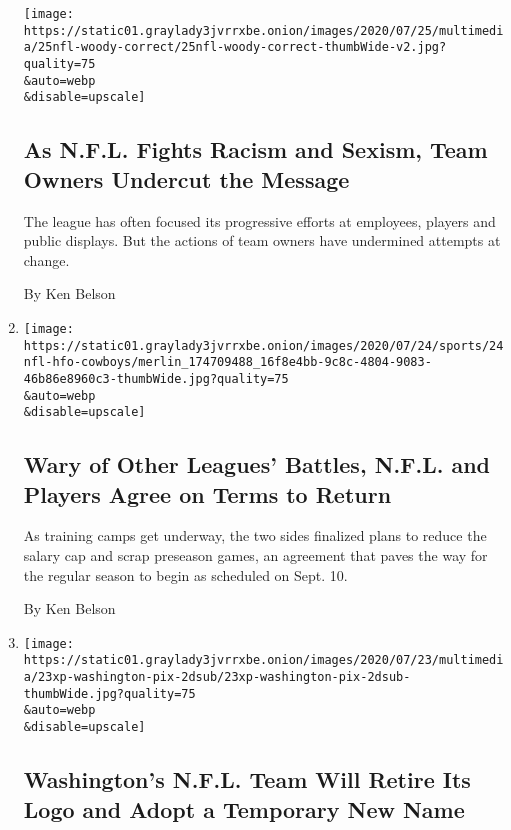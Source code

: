 \begin{enumerate}
  \texttt{[image: https://static01.graylady3jvrrxbe.onion/images/2020/07/25/multimedia/25nfl-woody-correct/25nfl-woody-correct-thumbWide-v2.jpg?quality=75\\\&auto=webp\\\&disable=upscale]}

  \hypertarget{as-nfl-fights-racism-and-sexism-team-owners-undercut-the-message}{%
  \subsection{As N.F.L. Fights Racism and Sexism, Team Owners Undercut
  the
  Message}\label{as-nfl-fights-racism-and-sexism-team-owners-undercut-the-message}}

  The league has often focused its progressive efforts at employees,
  players and public displays. But the actions of team owners have
  undermined attempts at change.

  By Ken Belson
\item
  \href{/2020/07/24/sports/football/nfl-players-regular-season-start.html}{}

  \texttt{[image: https://static01.graylady3jvrrxbe.onion/images/2020/07/24/sports/24nfl-hfo-cowboys/merlin\_174709488\_16f8e4bb-9c8c-4804-9083-46b86e8960c3-thumbWide.jpg?quality=75\\\&auto=webp\\\&disable=upscale]}

  \hypertarget{wary-of-other-leagues-battles-nfl-and-players-agree-on-terms-to-return}{%
  \subsection{Wary of Other Leagues' Battles, N.F.L. and Players Agree
  on Terms to
  Return}\label{wary-of-other-leagues-battles-nfl-and-players-agree-on-terms-to-return}}

  As training camps get underway, the two sides finalized plans to
  reduce the salary cap and scrap preseason games, an agreement that
  paves the way for the regular season to begin as scheduled on Sept.
  10.

  By Ken Belson
\item
  \href{/2020/07/23/sports/football/washington-football-team-name-logo.html}{}

  \texttt{[image: https://static01.graylady3jvrrxbe.onion/images/2020/07/23/multimedia/23xp-washington-pix-2dsub/23xp-washington-pix-2dsub-thumbWide.jpg?quality=75\\\&auto=webp\\\&disable=upscale]}

  \hypertarget{washingtons-nfl-team-will-retire-its-logo-and-adopt-a-temporary-new-name}{%
  \subsection{Washington's N.F.L. Team Will Retire Its Logo and Adopt a
  Temporary New
  Name}\label{washingtons-nfl-team-will-retire-its-logo-and-adopt-a-temporary-new-name}}


\end{enumerate}
